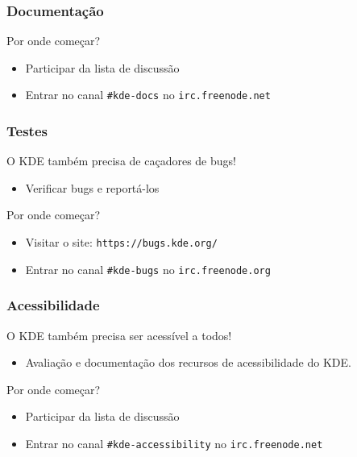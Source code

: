 \documentclass[hyperref={pdfpagelabels=false}]{beamer}
\begin{document}
\begin{frame}
   \frametitle{Documentação}
   Por onde começar?
   \begin{itemize}
      \item Participar da lista de discussão
      \item Entrar no canal {\tt{\#kde-docs}} no {\tt{irc.freenode.net}}
   \end{itemize}
\end{frame}
\begin{frame}
   \frametitle{Testes}
   \begin{center}
      \begin{block}{}
         \begin{center}
            O KDE também precisa de caçadores de bugs!
         \end{center}
      \end{block}
   \end{center}
   \begin{itemize}
      \item Verificar bugs e reportá-los
   \end{itemize}
   
   Por onde começar?
   \begin{itemize}
      \item Visitar o site: {\tt{https://bugs.kde.org/}}
      \item Entrar no canal {\tt{\#kde-bugs}} no {\tt{irc.freenode.org}}
   \end{itemize}
\end{frame}
\begin{frame}
   \frametitle{Acessibilidade}
   \begin{center}
      \begin{block}{}
         \begin{center}
            O KDE também precisa ser acessível a todos!            
         \end{center}
      \end{block}
   \end{center}
   \begin{itemize}
      \item Avaliação e documentação dos recursos de acessibilidade do KDE.
   \end{itemize}

   Por onde começar?
   \begin{itemize}
      \item Participar da lista de discussão
      \item Entrar no canal {\tt{\#kde-accessibility}} no {\tt{irc.freenode.net}}
   \end{itemize}
\end{frame}
\end{document}
